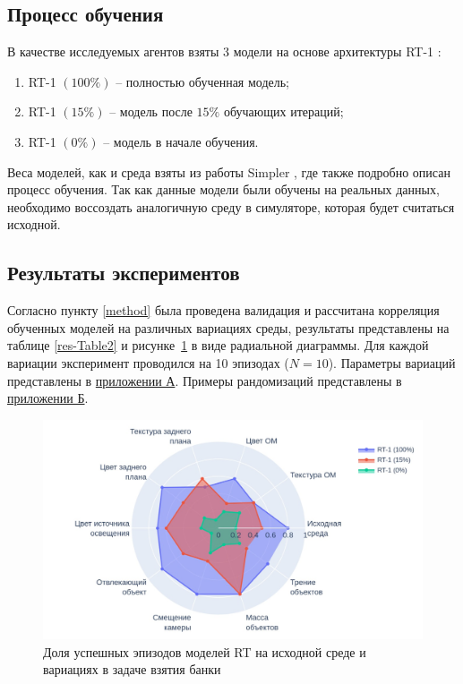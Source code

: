         \subsection{Процесс обучения}

            В качестве исследуемых агентов взяты 3 модели на основе архитектуры RT-1 \cite{brohan2023rt1roboticstransformerrealworld}:

            \begin{enumerate}
                \item RT-1 $(100\%)$ -- полностью обученная модель;
                \item RT-1 $(15\%)$ -- модель после $15\%$ обучающих итераций;
                \item RT-1 $(0\%)$ -- модель в начале обучения.
            \end{enumerate}
            
            Веса моделей, как и среда взяты из работы Simpler \cite{li24simpler}, где также подробно описан процесс обучения. Так как данные модели были обучены на реальных данных, необходимо воссоздать аналогичную среду в симуляторе, которая будет считаться исходной. 

        \subsection{Результаты экспериментов}

            Согласно пункту \ref{method} была проведена валидация и рассчитана корреляция обученных моделей на различных вариациях среды, результаты представлены на таблице \ref{res-Table2} и рисунке~\ref{fig:sh2} в виде радиальной диаграммы. Для каждой вариации эксперимент проводился на 10 эпизодах ($N = 10$). Параметры вариаций представлены в \hyperref[sec:params]{приложении А}. Примеры рандомизаций представлены в \hyperref[sec:randomization]{приложении Б}.

            \begin{figure}[h]
              \begin{center}
                  \includegraphics[width=\textwidth]{images/spider_chart_2.jpg}
              \caption{Доля успешных эпизодов моделей RT на исходной среде и вариациях в задаче взятия банки}
              \label{fig:sh2}
              \end{center}
            \end{figure}

